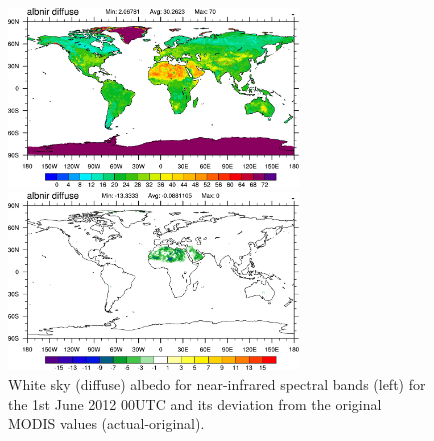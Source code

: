 \documentclass[a4paper,11pt]{article}
\begin{document}
\begin{figure}[ht]
\begin{minipage}[t]{\textwidth}
  \begin{minipage}[t]{0.496\textwidth}
    \center
    \includegraphics[width=7.7cm]{albnirdif_20120601_tuned.png}
  \end{minipage}
  \begin{minipage}[t]{0.496\textwidth}
    \center
    \includegraphics[width=7.7cm]{albnirdif_20120601_tuned-untuned.png}
  \end{minipage}
\end{minipage}
\caption{White sky (diffuse) albedo for near-infrared spectral bands (left) for the 1st June 2012 00UTC and its deviation from the original MODIS values (actual-original).}\label{fig_albnirdif}
\end{figure}
\end{document}
